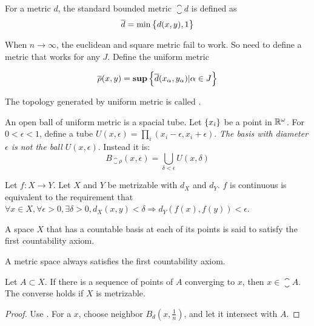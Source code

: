 \begin{definition}
    For a metric $d$, the standard bounded metric \emph{$\closure{d}$} is defined as
    \begin{equation}
        \overline{d} = \min \set{d(x,y), 1}
    \end{equation}
\end{definition}


\begin{definition}
    When $n \rightarrow \infty$, the euclidean and square metric fail to work. So need to define a metric that works for any $J$. Define the uniform metric 
    
    \begin{equation}
        \overline{\rho}(x,y) = \mathbf{sup} \set{ \overline{d}(x_{\alpha}, y_{\alpha}) | \alpha \in J}
    \end{equation}
    
    The topology generated by uniform metric is called .
    
    An open ball of uniform metric is a spacial tube. Let $\set{x_i}$ be a point in $\mathbb{R}^\omega$. For $0 < \epsilon < 1$, define a tube $U(x,\epsilon) = \prod_i (x_i - \epsilon, x_i + \epsilon)$. \emph{The basis with diameter $\epsilon$ is not the ball $U(x, \epsilon)$}. Instead it is:
    \begin{equation}
        B_{\closure{\rho}}(x, \epsilon) = \bigcup_{\delta < \epsilon} U(x, \delta)
    \end{equation}
\end{definition}

\begin{theorem}
Let $f: X \rightarrow Y$. Let $X$ and $Y$ be metrizable with $d_X$ and $d_Y$. $f$ is continuous is equivalent to the requirement that $\forall x \in X, \forall \epsilon > 0, \exists \delta > 0, d_X (x,y) < \delta \Rightarrow d_Y \left(f(x), f(y) \right) < \epsilon $.
\end{theorem}


\begin{definition}\label{first_countability_axiom}
    A space $X$ that has a countable basis at each of its points is said to satisfy the first countability axiom. 
    
    A metric space always satisfies the first countability axiom.
\end{definition}

\begin{theorem}\label{sequence_lemma}
    Let $A \subset X$. If there is a sequence of points of $A$ converging to $x$, then $x \in \closure{A}$. The converse holds if $X$ is metrizable.
\end{theorem}
\begin{proof}
    Use . For a $x$, choose neighbor $B_d(x, \frac{1}{n})$, and let it intersect with $A$.
\end{proof}


